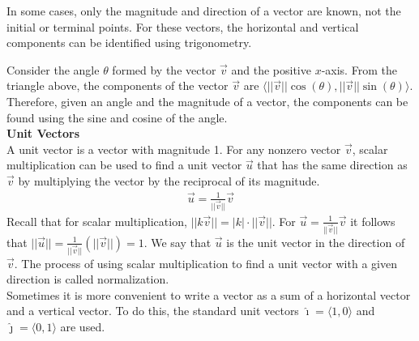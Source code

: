 \documentclass[a4paper]{article}
\let\bf\textbf
\let\la\langle
\let\ra\rangle
\newcommand{\ih}{\hat{\imath}}
\newcommand{\jh}{\hat{\jmath}}
\begin{document}
\newpage\noindent
In some cases, only the magnitude and direction of a vector are known, not the initial or terminal points. For these vectors, the horizontal and vertical components can be identified using trigonometry.
\begin{center}
\end{center}
Consider the angle $\theta$ formed by the vector $\vec{v}$ and the positive $x$-axis. From the triangle above, the components of the vector $\vec{v}$ are $\la ||\vec{v}||\cos(\theta),||\vec{v}||\sin(\theta) \ra$. Therefore, given an angle and the magnitude of a vector, the components can be found using the sine and cosine of the angle.
\vspace{2mm}\\
\bf{Unit Vectors}
\vspace{2mm}\\
A unit vector is a vector with magnitude 1. For any nonzero vector $\vec{v}$, scalar multiplication can be used to find a unit vector $\vec{u}$ that has the same direction as $\vec{v}$ by multiplying the vector by the reciprocal of its magnitude.
\begin{align*}
    \vec{u} = \frac{1}{||\vec{v}||}\vec{v}
\end{align*} 
Recall that for scalar multiplication, $||k\vec{v}|| = |k| \cdot ||\vec{v}||$. For $\vec{u} = \frac{1}{||\vec{v}||}\vec{v}$ it follows that $||\vec{u}|| = \frac{1}{||\vec{v}||}(||\vec{v}||) = 1$. We say that $\vec{u}$ is the unit vector in the direction of $\vec{v}$. The process of using scalar multiplication to find a unit vector with a given direction is called normalization.
\vspace{1mm}\\
Sometimes it is more convenient to write a vector as a sum of a horizontal vector and a vertical vector. To do this, the standard unit vectors $\ih = \la 1, 0 \ra$ and $\jh = \la 0, 1 \ra$ are used.
\end{document}
